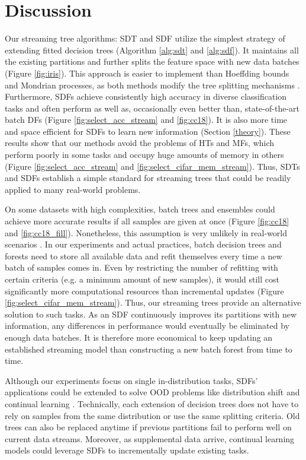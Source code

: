 \section{Discussion}
\label{discussion}
Our streaming tree algorithms: SDT and SDF utilize the simplest strategy of extending fitted decision trees (Algorithm \ref{alg:sdt} and \ref{alg:sdf}). It maintains all the existing partitions and further splits the feature space with new data batches (Figure \ref{fig:iris}). This approach is easier to implement than Hoeffding bounds and Mondrian processes, as both methods modify the tree splitting mechanisms \citep{hoeffding_probability_1994, domingos_mining_2000, roy_mondrian_2009, lakshminarayanan_mondrian_2014}. 
Furthermore, SDFs achieve consistently high accuracy in diverse classification tasks and often perform as well as, occasionally even better than, state-of-the-art batch DFs (Figure \ref{fig:select_acc_stream} and \ref{fig:cc18}). It is also more time and space efficient for SDFs to learn new information (Section \ref{theory}).
These results show that our methods avoid the problems of HTs and MFs, which perform poorly in some tasks and occupy huge amounts of memory in others (Figure \ref{fig:select_acc_stream} and \ref{fig:select_cifar_mem_stream}). Thus, SDTs and SDFs establish a simple standard for streaming trees that could be readily applied to many real-world problems.

On some datasets with high complexities, batch trees and ensembles could achieve more accurate results if all samples are given at once (Figure \ref{fig:cc18} and \ref{fig:cc18_fill}). Nonetheless, this assumption is very unlikely in real-world scenarios \citep{abdulsalam_streaming_2007, liu_isolation_2008}. In our experiments and actual practices, batch decision trees and forests need to store all available data and refit themselves every time a new batch of samples comes in. Even by restricting the number of refitting with certain criteria (e.g. a minimum amount of new samples), it would still cost significantly more computational resources than incremental updates (Figure \ref{fig:select_cifar_mem_stream}). Thus, our streaming trees provide an alternative solution to such tasks. As an SDF continuously improves its partitions with new information, any differences in performance would eventually be eliminated by enough data batches. It is therefore more economical to keep updating an established streaming model than constructing a new batch forest from time to time.

Although our experiments focus on single in-distribution tasks, SDFs' applications could be extended to solve OOD problems like distribution shift and continual learning \citep{geisa_towards_2021, van_de_ven_three_2019}. 
Technically, each extension of decision trees does not have to rely on samples from the same distribution or use the same splitting criteria. Old trees can also be replaced anytime if previous partitions fail to perform well on current data streams. Moreover, as supplemental data arrive, continual learning models could leverage SDFs to incrementally update existing tasks.

